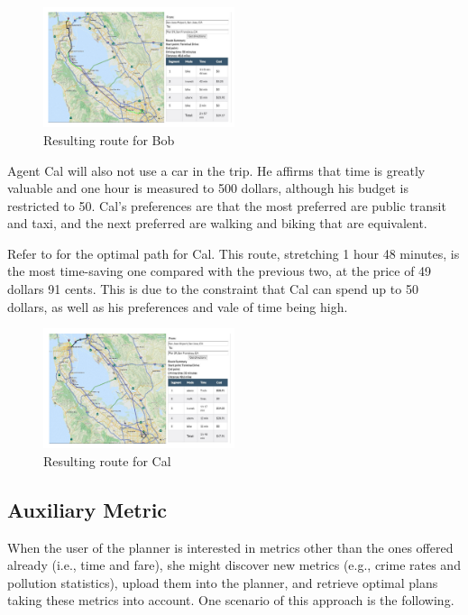 \begin{figure}[!ht]
  \centering
    \includegraphics[width=0.5\textwidth]{figs/result_Bob.pdf}
  \caption{Resulting route for Bob\label{fig:bob}}
\end{figure}


Agent Cal will also not use a car in the trip.
He affirms that time is greatly valuable and one hour is measured
to 500 dollars, although his budget is restricted to 50.
Cal's preferences are that the most preferred are public transit
and taxi, and the next preferred are walking and biking that
are equivalent.

Refer to  for the optimal path for Cal.
This route, stretching 1 hour 48 minutes, is the most time-saving one 
compared with the previous two, at the price of 49 dollars 91 cents.
This is due to the constraint that Cal can spend up to 50 dollars,
as well as his preferences and vale of time being high.

\begin{figure}[!ht]
  \centering
    \includegraphics[width=0.5\textwidth]{figs/result_Cal.pdf}
  \caption{Resulting route for Cal\label{fig:cal}}
\end{figure}

\subsection{Auxiliary Metric}
When the user of the planner is interested in metrics other than
the ones offered already (i.e., time and fare), she might discover
new metrics (e.g., crime rates and pollution statistics), upload
them into the planner, and retrieve optimal plans taking these
metrics into account.  One scenario of this approach is the following.

